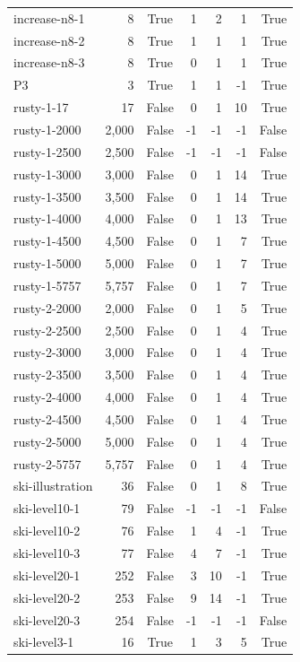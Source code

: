 \begin{table}[ht]
\begin{tabular}{l r c r r r r}
increase-n8-1 & 8 & True & 1 & 2 & 1 & True \\
increase-n8-2 & 8 & True & 1 & 1 & 1 & True \\
increase-n8-3 & 8 & True & 0 & 1 & 1 & True \\
P3 & 3 & True & 1 & 1 & -1 & True \\
rusty-1-17 & 17 & False & 0 & 1 & 10 & True \\
rusty-1-2000 & 2,000 & False & -1 & -1 & -1 & False \\
rusty-1-2500 & 2,500 & False & -1 & -1 & -1 & False \\
rusty-1-3000 & 3,000 & False & 0 & 1 & 14 & True \\
rusty-1-3500 & 3,500 & False & 0 & 1 & 14 & True \\
rusty-1-4000 & 4,000 & False & 0 & 1 & 13 & True \\
rusty-1-4500 & 4,500 & False & 0 & 1 & 7 & True \\
rusty-1-5000 & 5,000 & False & 0 & 1 & 7 & True \\
rusty-1-5757 & 5,757 & False & 0 & 1 & 7 & True \\
rusty-2-2000 & 2,000 & False & 0 & 1 & 5 & True \\
rusty-2-2500 & 2,500 & False & 0 & 1 & 4 & True \\
rusty-2-3000 & 3,000 & False & 0 & 1 & 4 & True \\
rusty-2-3500 & 3,500 & False & 0 & 1 & 4 & True \\
rusty-2-4000 & 4,000 & False & 0 & 1 & 4 & True \\
rusty-2-4500 & 4,500 & False & 0 & 1 & 4 & True \\
rusty-2-5000 & 5,000 & False & 0 & 1 & 4 & True \\
rusty-2-5757 & 5,757 & False & 0 & 1 & 4 & True \\
ski-illustration & 36 & False & 0 & 1 & 8 & True \\
ski-level10-1 & 79 & False & -1 & -1 & -1 & False \\
ski-level10-2 & 76 & False & 1 & 4 & -1 & True \\
ski-level10-3 & 77 & False & 4 & 7 & -1 & True \\
ski-level20-1 & 252 & False & 3 & 10 & -1 & True \\
ski-level20-2 & 253 & False & 9 & 14 & -1 & True \\
ski-level20-3 & 254 & False & -1 & -1 & -1 & False \\
ski-level3-1 & 16 & True & 1 & 3 & 5 & True \\

\end{tabular}
\end{table}
